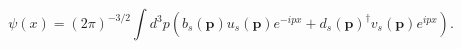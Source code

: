 \begin{equation}
\psi(x) = (2\pi)^{-3/2} \!\!\!\int\!\! d^3p 
\left( b_s({\mathbf{p}}) u_s ({\mathbf{p}}) e^{-ipx} 
\!+\! {d_s({\mathbf{p}})}^\dagger v_s({\mathbf{p}}) 
e^{ipx} \right). \label{4-1}
\end{equation}

